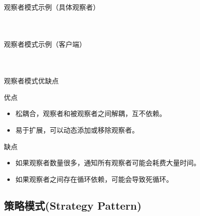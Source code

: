 \documentclass[UTF8,aspectratio=169]{beamer}
\begin{document}
\begin{frame}{观察者模式示例（具体观察者）}
    \begin{columns}
        \begin{column}{0.48\textwidth}
            \inputminted[firstline=59, lastline=70]{cpp}{code/observer_pattern.cpp}
        \end{column}
        \begin{column}{0.48\textwidth}
            \inputminted[firstline=72, lastline=84]{cpp}{code/observer_pattern.cpp}
        \end{column}
    \end{columns}
\end{frame}

\begin{frame}{观察者模式示例（客户端）}
    \begin{columns}
        \begin{column}{0.48\textwidth}
            \inputminted[firstline=90, lastline=103]{cpp}{code/observer_pattern.cpp}
        \end{column}
        \begin{column}{0.48\textwidth}
            \inputminted[firstline=105, lastline=121]{cpp}{code/observer_pattern.cpp}
        \end{column}
    \end{columns}
\end{frame}

\begin{frame}{观察者模式优缺点}
    \begin{ytublock}{优点}
        \begin{itemize}
            \item 松耦合，观察者和被观察者之间解耦，互不依赖。
            \item 易于扩展，可以动态添加或移除观察者。
        \end{itemize}
    \end{ytublock}
    \begin{alertytublock}{缺点}
        \begin{itemize}
            \item 如果观察者数量很多，通知所有观察者可能会耗费大量时间。
            \item 如果观察者之间存在循环依赖，可能会导致死循环。
        \end{itemize}
    \end{alertytublock}
\end{frame}

\subsection{策略模式(Strategy Pattern)}
\end{document}

